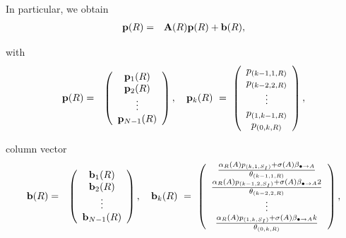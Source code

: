 \documentclass[preprint,12pt]{elsarticle}
\begin{document}
\par\noindent In particular, we obtain
\begin{eqnarray}\label{eqn:9}
 {\bf p}(R) &=& {\bf A}(R){\bf p}(R)+{\bf b}(R),
\end{eqnarray}
\par\noindent with
\begin{eqnarray*}
 {\bf p}(R) &=& \left(\begin{array}{c}
                         {\bf p}_1(R)\\
{\bf p}_2(R)\\
\vdots\\
{\bf p}_{N-1}(R)
\end{array}\right),\quad {\bf p}_k(R) \ = \ \left(\begin{array}{c}
p_{(k-1,1,R)}\\
p_{(k-2,2,R)}\\
\vdots\\
p_{(1,k-1,R)}\\
p_{(0,k,R)}
\end{array}\right),
\end{eqnarray*}
\par\noindent column vector
\begin{eqnarray*}
{\bf b}(R) &=& \left(\begin{array}{c}
                          {\bf b}_1(R)\\
{\bf b}_2(R)\\
\vdots\\
{\bf b}_{N-1}(R)
                         \end{array}\right),\quad
{\bf b}_k(R) \ = \ \left(\begin{array}{c}
               \frac{\alpha_R(A)p_{(k,1,S_I)}+\sigma(A)\beta_{\bullet\rightarrow A}}{\theta_{(k-1,1,R)}}\\
\frac{\alpha_R(A)p_{(k-1,2,S_I)}+\sigma(A)\beta_{\bullet\rightarrow A}2}{\theta_{(k-2,2,R)}}\\
\vdots\\
\frac{\alpha_R(A)p_{(1,k,S_I)}+\sigma(A)\beta_{\bullet\rightarrow A}k}{\theta_{(0,k,R)}}
                         \end{array}\right),
\end{eqnarray*}
\end{document}
